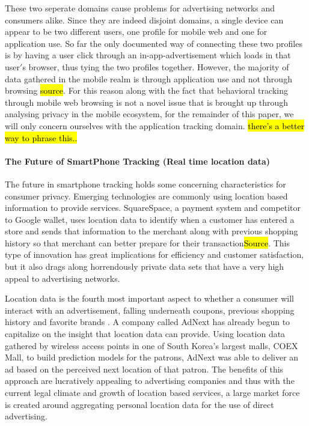 These two seperate domains cause problems for advertising networks and consumers alike. Since they are indeed disjoint domains, a single device can appear to be two different users, one profile for mobile web and one for application use. So far the only documented way of connecting these two profiles is by having a user click through an in-app-advertisement which loads in that user$'$s browser, thus tying the two profiles together\cite{Trust2013b}. 
However, the majority of data gathered in the mobile realm is through application use and not through browsing \hl{source}. For this reason along with the fact that behavioral tracking through mobile web browsing is not a novel issue that is brought up through analysing privacy in the mobile ecosystem, for the remainder of this paper, we will only concern ourselves with the application tracking domain. \hl{there's a better way to phrase this..} 

		\paragraph{The Future of SmartPhone Tracking (Real time location data)}
The future in smartphone tracking holds some concerning characteristics for consumer privacy. Emerging technologies are commonly using location based information to provide services. SquareSpace, a payment system and competitor to Google wallet, uses location data to identify when a customer has entered a store and sends that information to the merchant along with previous shopping history so that merchant can better prepare for their transaction\hl{Source}. This type of innovation has great implications for efficiency and customer satisfaction, but it also drags along horrendously private data sets that have a very high appeal to advertising networks.

Location data is the fourth most important aspect to whether a consumer will interact with an advertisement, falling underneath coupons, previous shopping history and favorite brands \cite{Abi2012}. A company called AdNext has already begun to capitalize on the insight that location data can provide. Using location data gathered by wireless access points in one of South Korea’s largest malls, COEX Mall, to build prediction models for the patrons, AdNext was able to deliver an ad based on the perceived next location of that patron\cite{adn2012}. The benefits of this approach are lucratively appealing to advertising companies and thus with the current legal climate and growth of location based services, a large market force is created around aggregating personal location data for the use of direct advertising.

